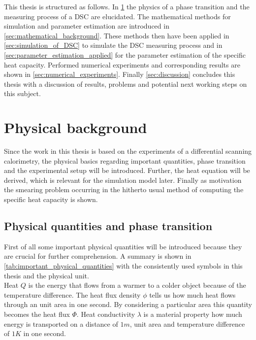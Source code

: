\documentclass{scrartcl}[12pt, halfparskip]
\numberwithin{equation}{section}
\numberwithin{figure}{section}
\numberwithin{table}{section}
\begin{document}
This thesis is structured as follows. In \cref{sec:physical_background} the physics of a phase transition and the measuring process of a DSC are elucidated. 
The mathematical methods for simulation and parameter estimation are introduced in \cref{sec:mathematical_background}. These methods then have been applied in \cref{sec:simulation_of_DSC} to simulate the DSC measuring process and in \cref{sec:parameter_estimation_applied} for the parameter estimation of the specific heat capacity. Performed numerical experiments and corresponding results are shown in \cref{sec:numerical_experiments}. Finally \cref{sec:discussion} concludes this thesis with a discussion of results, problems and potential next working steps on this subject.


\section{Physical background}
\label{sec:physical_background}

Since the work in this thesis is based on the experiments of a differential scanning calorimetry, the physical basics regarding important quantities, phase transition and the experimental setup will be introduced. Further, the heat equation will be derived, which is relevant for the simulation model later. Finally as motivation the smearing problem occurring in the hitherto usual method of computing the specific heat capacity is shown.


\subsection{Physical quantities and phase transition}

First of all some important physical quantities will be introduced because they are crucial for further comprehension. A summary is shown in \cref{tab:important_physical_quantities} with the consistently used symbols in this thesis and the physical unit. \\
Heat $Q$ is the energy that flows from a warmer to a colder object because of the temperature difference. The heat flux density $\phi$ tells us how much heat flows through an unit area in one second. By considering a particular area this quantity becomes the heat flux $\varPhi$. Heat conductivity $\lambda$ is a material property how much energy is transported on a distance of $1m$, unit area and temperature difference of $1K$ in one second.
\end{document}
